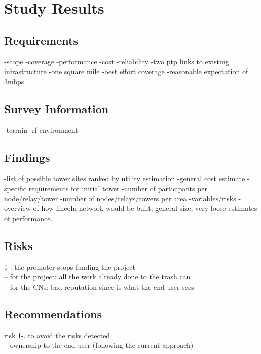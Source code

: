 \section{Study Results}\label{LPA}


%
\subsection{Requirements}
-scope -coverage -performance -cost -reliability
-two ptp links to existing infrastructure
-one square mile
-best effort coverage
-reasonable expectation of 3mbps


\subsection{Survey Information}
-terrain
-rf environment


\subsection{Findings}
-list of possible tower sites ranked by utility estimation
-general cost estimate
-specific requirements for initial tower
-number of participants per node/relay/tower
-number of nodes/relays/towers per area
-variables/risks
-overview of how lincoln network would be built, general size, very loose
estimates of performance. 


\subsection{Risks}
1-. the promoter stops funding the project\\
-- for the project: all the work already done to the trash can\\
-- for the CNs: bad reputation since is what the end user sees\\


\subsection{Recommendations}

risk 1-. to avoid the risks detected\\
-- ownership to the end user (following the current approach)\\

